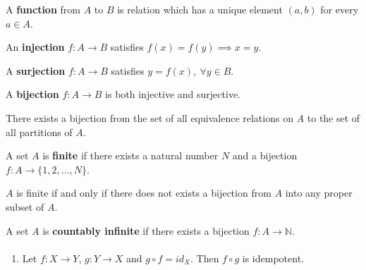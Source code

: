 \begin{definition}
	A \textbf{function} from $A$ to $B$ is relation which has a unique element $(a,b)$ for every $a \in A$.
\end{definition}

\begin{definition}
	An \textbf{injection} $f : A \to B$ satisfies $f(x) = f(y) \implies x = y$.
\end{definition}

\begin{definition}
	A \textbf{surjection} $f : A \to B$ satisfies $y = f(x),\ \forall y \in B$.
\end{definition}

\begin{definition}
	A \textbf{bijection} $f : A \to B$ is both injective and surjective.
\end{definition}
	There exists a bijection from the set of all equivalence relations on $A$ to the set of all partitions of $A$.

\begin{definition}
	A set $A$ is \textbf{finite} if there exists a natural number $N$ and a bijection $f : A \to \{1,2,\dots,N\}$.
\end{definition}
	$A$ is finite if and only if there does not exists a bijection from $A$ into any proper subset of $A$.

\begin{definition}
	A set $A$ is \textbf{countably infinite} if there exists a bijection $f : A \to \mathbb{N}$.
\end{definition}

\paragraph{}
\begin{enumerate}
	\item Let $f:X \to Y$, $g:Y \to X$ and $g \circ f = id_X$. Then $f \circ g$ is idempotent.
\end{enumerate}

